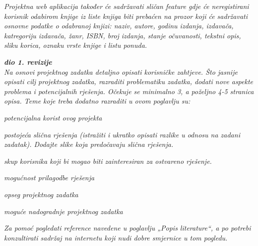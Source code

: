 	\textit{Projektna web aplikacija također će sadržavati sličan feature gdje će neregistirani korisnik odabirom knjige iz liste knjiga biti prebaćen na prozor koji će sadržavati osnovne podatke o odabranoj knjizi: naziv, autore, godinu izdanja, izdavača, katregoriju izdavača, žanr, ISBN, broj izdanja, stanje očuvanosti, tekstni opis, sliku korica, oznaku vrste knjige i listu ponuda.}
	

	 	
		
		
		
		
		
		
		
		
		
		
		
		
		
		
		
		
		
		
		
		
		
	
		
		
		
		
		
		
		
		
		
		
		
		
		
		
		\textbf{\textit{dio 1. revizije}}\\
		
		\textit{Na osnovi projektnog zadatka detaljno opisati korisničke zahtjeve. Što jasnije opisati cilj projektnog zadatka, razraditi problematiku zadatka, dodati nove aspekte problema i potencijalnih rješenja. Očekuje se minimalno 3, a poželjno 4-5 stranica opisa.	Teme koje treba dodatno razraditi u ovom poglavlju su:}
		\begin{packed_item}
			\item \textit{potencijalna korist ovog projekta}
			\item \textit{postojeća slična rješenja (istražiti i ukratko opisati razlike u odnosu na zadani zadatak). Dodajte slike koja predočavaju slična rješenja.}
			\item \textit{skup korisnika koji bi mogao biti zainteresiran za ostvareno rješenje.}
			\item \textit{mogućnost prilagodbe rješenja }
			\item \textit{opseg projektnog zadatka}
			\item \textit{moguće nadogradnje projektnog zadatka}
		\end{packed_item}
		
		\textit{Za pomoć pogledati reference navedene u poglavlju „Popis literature“, a po potrebi konzultirati sadržaj na internetu koji nudi dobre smjernice u tom pogledu.}
		\eject
		
